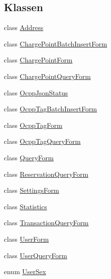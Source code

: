 \subsection*{Klassen}
\begin{DoxyCompactItemize}
\item 
class \hyperlink{classde_1_1rwth_1_1idsg_1_1steve_1_1web_1_1dto_1_1_address}{Address}
\item 
class \hyperlink{classde_1_1rwth_1_1idsg_1_1steve_1_1web_1_1dto_1_1_charge_point_batch_insert_form}{Charge\+Point\+Batch\+Insert\+Form}
\item 
class \hyperlink{classde_1_1rwth_1_1idsg_1_1steve_1_1web_1_1dto_1_1_charge_point_form}{Charge\+Point\+Form}
\item 
class \hyperlink{classde_1_1rwth_1_1idsg_1_1steve_1_1web_1_1dto_1_1_charge_point_query_form}{Charge\+Point\+Query\+Form}
\item 
class \hyperlink{classde_1_1rwth_1_1idsg_1_1steve_1_1web_1_1dto_1_1_ocpp_json_status}{Ocpp\+Json\+Status}
\item 
class \hyperlink{classde_1_1rwth_1_1idsg_1_1steve_1_1web_1_1dto_1_1_ocpp_tag_batch_insert_form}{Ocpp\+Tag\+Batch\+Insert\+Form}
\item 
class \hyperlink{classde_1_1rwth_1_1idsg_1_1steve_1_1web_1_1dto_1_1_ocpp_tag_form}{Ocpp\+Tag\+Form}
\item 
class \hyperlink{classde_1_1rwth_1_1idsg_1_1steve_1_1web_1_1dto_1_1_ocpp_tag_query_form}{Ocpp\+Tag\+Query\+Form}
\item 
class \hyperlink{classde_1_1rwth_1_1idsg_1_1steve_1_1web_1_1dto_1_1_query_form}{Query\+Form}
\item 
class \hyperlink{classde_1_1rwth_1_1idsg_1_1steve_1_1web_1_1dto_1_1_reservation_query_form}{Reservation\+Query\+Form}
\item 
class \hyperlink{classde_1_1rwth_1_1idsg_1_1steve_1_1web_1_1dto_1_1_settings_form}{Settings\+Form}
\item 
class \hyperlink{classde_1_1rwth_1_1idsg_1_1steve_1_1web_1_1dto_1_1_statistics}{Statistics}
\item 
class \hyperlink{classde_1_1rwth_1_1idsg_1_1steve_1_1web_1_1dto_1_1_transaction_query_form}{Transaction\+Query\+Form}
\item 
class \hyperlink{classde_1_1rwth_1_1idsg_1_1steve_1_1web_1_1dto_1_1_user_form}{User\+Form}
\item 
class \hyperlink{classde_1_1rwth_1_1idsg_1_1steve_1_1web_1_1dto_1_1_user_query_form}{User\+Query\+Form}
\item 
enum \hyperlink{enumde_1_1rwth_1_1idsg_1_1steve_1_1web_1_1dto_1_1_user_sex}{User\+Sex}
\end{DoxyCompactItemize}

